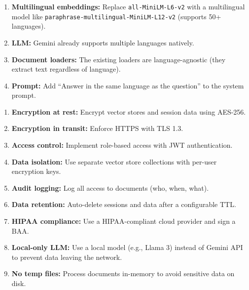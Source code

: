 \documentclass[12pt,a4paper]{article}
\begin{document}
\begin{interviewbox}
\end{interviewbox}
\begin{answerbox}
\begin{enumerate}
  \item \textbf{Multilingual embeddings:} Replace \texttt{all-MiniLM-L6-v2} with a multilingual model like \texttt{paraphrase-multilingual-MiniLM-L12-v2} (supports 50+ languages).
  \item \textbf{LLM:} Gemini already supports multiple languages natively.
  \item \textbf{Document loaders:} The existing loaders are language-agnostic (they extract text regardless of language).
  \item \textbf{Prompt:} Add ``Answer in the same language as the question'' to the system prompt.
\end{enumerate}
\end{answerbox}

\begin{interviewbox}
\end{interviewbox}
\begin{answerbox}
\begin{enumerate}
  \item \textbf{Encryption at rest:} Encrypt vector stores and session data using AES-256.
  \item \textbf{Encryption in transit:} Enforce HTTPS with TLS 1.3.
  \item \textbf{Access control:} Implement role-based access with JWT authentication.
  \item \textbf{Data isolation:} Use separate vector store collections with per-user encryption keys.
  \item \textbf{Audit logging:} Log all access to documents (who, when, what).
  \item \textbf{Data retention:} Auto-delete sessions and data after a configurable TTL.
  \item \textbf{HIPAA compliance:} Use a HIPAA-compliant cloud provider and sign a BAA.
  \item \textbf{Local-only LLM:} Use a local model (e.g., Llama 3) instead of Gemini API to prevent data leaving the network.
  \item \textbf{No temp files:} Process documents in-memory to avoid sensitive data on disk.
\end{enumerate}
\end{answerbox}
\end{document}

